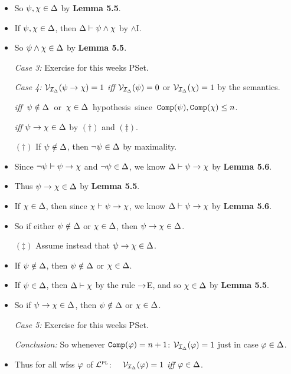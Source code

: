 \documentclass[a4paper, 11pt]{article} %
\begin{document}
\begin{itemize}
      \item So $\psi,\chi\in\Delta$ by \textbf{Lemma 5.5}.
      \item If $\psi,\chi\in\Delta$, then $\Delta \vdash \psi \wedge \chi$ by $\wedge$I. 
      \item So $\psi \wedge \chi \in \Delta$ by \textbf{Lemma 5.5}.
    \item[\it Case 3:] Exercise for this weeks PSet.
    \item[\it Case 4:] $\mathcal{V}_{\mathcal{I}_\Delta}(\psi \rightarrow \chi)=1$ \textit{iff} $\mathcal{V}_{\mathcal{I}_\Delta}(\psi) = 0$ or $\mathcal{V}_{\mathcal{I}_\Delta}(\chi) = 1$ by the semantics.
      \item[] \hspace{1.1in} \mbox{\textit{iff} $\psi\notin\Delta$ or $\chi \in \Delta$ hypothesis since $\texttt{Comp}(\psi), \texttt{Comp}(\chi) \leq n$.}
      \item[] \hspace{1.1in} \textit{iff} $\psi\rightarrow\chi\in\Delta$ by $(\dagger)$ and $(\ddagger)$.
      \item[$(\dagger)$] If $\psi\notin\Delta$, then $\neg\psi\in\Delta$ by maximality.
      \item Since $\neg \psi \vdash \psi \rightarrow \chi$ and $\neg \psi \in \Delta$, we know $\Delta\vdash\psi\rightarrow\chi$ by \textbf{Lemma 5.6}.
      \item Thus $\psi\rightarrow\chi\in\Delta$ by \textbf{Lemma 5.5}.
      \item If $\chi\in\Delta$, then since $\chi\vdash\psi\rightarrow\chi$, we know $\Delta\vdash\psi\rightarrow\chi$ by \textbf{Lemma 5.6}.
      \item So if either $\psi\notin\Delta$ or $\chi\in\Delta$, then $\psi\rightarrow\chi\in\Delta$. 
      \item[$(\ddagger)$] Assume instead that $\psi\rightarrow\chi\in\Delta$.
      \item If $\psi\notin\Delta$, then $\psi\notin\Delta$ or $\chi\in\Delta$.
      \item If $\psi\in\Delta$, then $\Delta\vdash\chi$ by the rule $\rightarrow$E, and so $\chi\in\Delta$ by \textbf{Lemma 5.5}.
      \item So if $\psi\rightarrow\chi\in\Delta$, then $\psi\notin\Delta$ or $\chi\in\Delta$.  
    \item[\it Case 5:] Exercise for this weeks PSet.
    \item[\it Conclusion:] So whenever $\texttt{Comp}(\varphi) = n + 1$: $\mathcal{V}_{\mathcal{I}_\Delta}(\varphi)=1$ just in case $\varphi\in\Delta$.
      \item Thus for all wfss $\varphi$ of $\mathcal{L}^{\textsc{pl}}$:~~ $\mathcal{V}_{\mathcal{I}_{\Delta}}(\varphi) = 1$ \textit{iff} $\varphi\in\Delta$.
\end{itemize}
\end{document}
